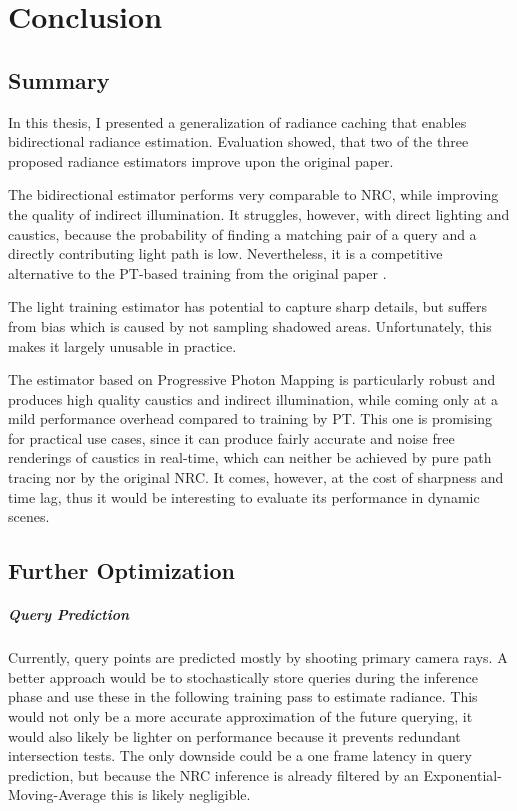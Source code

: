 
\chapter{Conclusion}
\label{chap:conclusion}

\section{Summary}
In this thesis, I presented a generalization of radiance caching that enables bidirectional radiance estimation.
Evaluation showed, that two of the three proposed radiance estimators improve upon the original paper.

The bidirectional estimator performs very comparable to NRC, while improving the quality of indirect illumination.
It struggles, however, with direct lighting and caustics, because the probability of finding a matching pair of a query and a directly contributing light path is low.
Nevertheless, it is a competitive alternative to the PT-based training from the original paper \parencite{muller2021}.

The light training estimator has potential to capture sharp details, but suffers from bias which is caused by not sampling shadowed areas.
Unfortunately, this makes it largely unusable in practice.

The estimator based on Progressive Photon Mapping is particularly robust and produces high quality caustics and indirect illumination, while coming only at a mild performance overhead compared to training by PT.
This one is promising for practical use cases, since it can produce fairly accurate and noise free renderings of caustics in real-time, which can neither be achieved by pure path tracing nor by the original NRC.
It comes, however, at the cost of sharpness and time lag, thus it would be interesting to evaluate its performance in dynamic scenes.

\section{Further Optimization}

\paragraph{Query Prediction}
Currently, query points are predicted mostly by shooting primary camera rays.
A better approach would be to stochastically store queries during the inference phase and use these in the following training pass to estimate radiance.
This would not only be a more accurate approximation of the future querying, it would also likely be lighter on performance because it prevents redundant intersection tests.
The only downside could be a one frame latency in query prediction, but because the NRC inference is already filtered by an Exponential-Moving-Average this is likely negligible.

